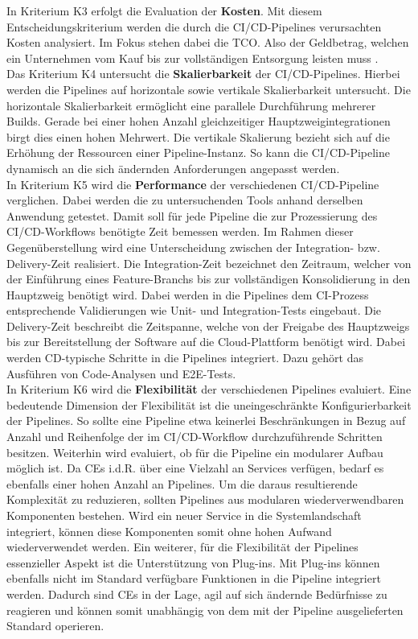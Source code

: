 In Kriterium K3 erfolgt die Evaluation der \textbf{Kosten}. Mit diesem Entscheidungskriterium werden die durch die CI/CD-Pipelines verursachten Kosten analysiert. Im Fokus stehen dabei die \ac{TCO}. Also der Geldbetrag, welchen ein Unternehmen vom Kauf bis zur vollständigen Entsorgung leisten muss \cite[3]{Ellram.1993}.\\
Das Kriterium K4 untersucht die \textbf{Skalierbarkeit} der CI/CD-Pipelines. Hierbei werden die Pipelines auf horizontale sowie vertikale Skalierbarkeit untersucht. Die horizontale Skalierbarkeit ermöglicht eine parallele Durchführung mehrerer Builds. Gerade bei einer hohen Anzahl gleichzeitiger Hauptzweigintegrationen birgt dies einen hohen Mehrwert. Die vertikale Skalierung bezieht sich auf die Erhöhung der Ressourcen einer Pipeline-Instanz. So kann die CI/CD-Pipeline dynamisch an die sich ändernden Anforderungen angepasst werden.\\
In Kriterium K5 wird die \textbf{Performance} der verschiedenen CI/CD-Pipeline verglichen. Dabei werden die zu untersuchenden Tools anhand derselben Anwendung getestet. Damit soll für jede Pipeline die zur Prozessierung des CI/CD-Workflows benötigte Zeit bemessen werden. Im Rahmen dieser Gegenüberstellung wird eine Unterscheidung zwischen der Integration- bzw. Delivery-Zeit realisiert. Die Integration-Zeit bezeichnet den Zeitraum, welcher von der Einführung eines Feature-Branchs bis zur vollständigen Konsolidierung in den Hauptzweig benötigt wird. Dabei werden in die Pipelines dem CI-Prozess entsprechende Validierungen wie Unit- und Integration-Tests eingebaut. Die Delivery-Zeit beschreibt die Zeitspanne, welche von der Freigabe des Hauptzweigs bis zur Bereitstellung der Software auf die Cloud-Plattform benötigt wird. Dabei werden CD-typische Schritte in die Pipelines integriert. Dazu gehört das Ausführen von Code-Analysen und E2E-Tests.\\
In Kriterium K6 wird die \textbf{Flexibilität} der verschiedenen Pipelines evaluiert. Eine bedeutende Dimension der Flexibilität ist die uneingeschränkte Konfigurierbarkeit der Pipelines. So sollte eine Pipeline etwa keinerlei Beschränkungen in Bezug auf Anzahl und Reihenfolge der im CI/CD-Workflow durchzuführende Schritten besitzen. Weiterhin wird evaluiert, ob für die Pipeline ein modularer Aufbau möglich ist. Da CEs i.d.R. über eine Vielzahl an Services verfügen, bedarf es ebenfalls einer hohen Anzahl an Pipelines. Um die daraus resultierende Komplexität zu reduzieren, sollten Pipelines aus modularen wiederverwendbaren Komponenten bestehen. Wird ein neuer Service in die Systemlandschaft integriert, können diese Komponenten somit ohne hohen Aufwand wiederverwendet werden. Ein weiterer, für die Flexibilität der Pipelines essenzieller Aspekt ist die Unterstützung von Plug-ins. Mit Plug-ins können ebenfalls nicht im Standard verfügbare Funktionen in die Pipeline integriert werden. Dadurch sind CEs in der Lage, agil auf sich ändernde Bedürfnisse zu reagieren und können somit unabhängig von dem mit der Pipeline ausgelieferten Standard operieren.\\  
